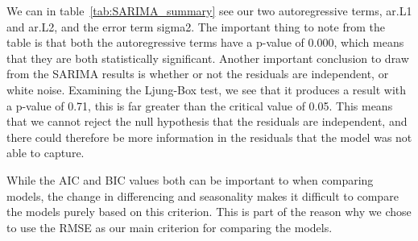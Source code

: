 We can in table~\ref{tab:SARIMA_summary} see our two autoregressive terms, ar.L1 and ar.L2, and the error term sigma2. The important thing to note from the table is that both the autoregressive terms have a p-value of 0.000, which means that they are both statistically significant. Another important conclusion to draw from the SARIMA results is whether or not the residuals are independent, or white noise. Examining the Ljung-Box test, we see that it produces a result with a p-value of 0.71, this is far greater than the critical value of 0.05. This means that we cannot reject the null hypothesis that the residuals are independent, and there could therefore be more information in the residuals that the model was not able to capture. 

While the AIC and BIC values both can be important to when comparing models, the change in differencing and seasonality makes it difficult to compare the models purely based on this criterion. This is part of the reason why we chose to use the RMSE as our main criterion for comparing the models.
